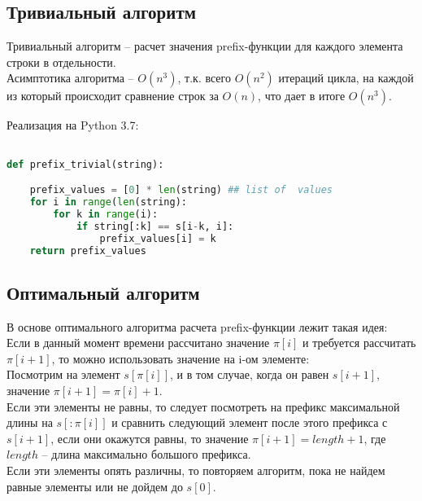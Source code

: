 \documentclass[a4paper,12pt]{article} %
\begin{document}
\subsection{Тривиальный алгоритм}

Тривиальный алгоритм – расчет значения prefix-функции для каждого элемента строки в отдельности.\\

Асимптотика алгоритма – $O(n^3)$, т.к. всего $O(n^2)$ итераций цикла, на каждой из который происходит сравнение строк за $O(n)$, что дает в итоге $O(n^3)$.\\

\newpage

Реализация на Python 3.7:

\begin{lstlisting}[language=Python]

def prefix_trivial(string):

	prefix_values = [0] * len(string) ## list of  values
	for i in range(len(string):
		for k in range(i):
			if string[:k] == s[i-k, i]:
				prefix_values[i] = k			
	return prefix_values

\end{lstlisting}

\subsection{Оптимальный алгоритм}

В основе оптимального алгоритма расчета prefix-функции лежит такая идея:\\

Если в данный момент времени рассчитано значение  $\pi[i]$ и требуется рассчитать $\pi[i+1]$, то можно использовать значение на i-ом элементе:\\

Посмотрим на элемент $s[\pi[i]]$, и в том случае, когда он равен $s[i+1]$, значение $\pi[i+1]=\pi[i]+1$.\\

Если эти элементы не равны, то следует посмотреть на префикс максимальной длины на $s[ : \pi[i]]$ и сравнить следующий элемент после этого префикса с $s[i+1]$, если они окажутся равны, то значение $\pi[i+1]=length+1$, где $length$ – длина максимально большого префикса.\\

Если эти элементы опять различны, то повторяем алгоритм, пока не найдем равные элементы или не дойдем до $s[0]$.\\
\end{document}
